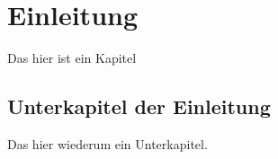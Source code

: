 \section{Einleitung}
\label{sec:einleitung}
Das hier ist ein Kapitel

\subsection{Unterkapitel der Einleitung}
Das hier wiederum ein Unterkapitel.
